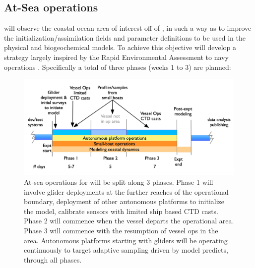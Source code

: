   
\subsection{At-Sea operations}

\proj will observe the coastal ocean area of interest off of \naze, in
such a way as to improve the initialization/assimilation fields and
parameter definitions to be used in the physical and biogeochemical
models. To achieve this objective \proj will develop a strategy largely
inspired by the Rapid Environmental Assessment to navy operations
. Specifically a total of three phases (weeks 1 to 3) are
planned:


\begin{figure}[!t]
  \vspace{-0.5cm}
  \centering
  \includegraphics[scale=0.25]{fig/timelines.jpg}
  \caption{At-sea operations for \proj will be split along 3 phases.
    Phase 1 will involve glider deployments at the further reaches of
    the operational boundary, deployment of other autonomous platforms
    to initialize the model, calibrate sensors with limited ship based
    CTD casts. Phase 2 will commence when the vessel departs the \naz
    operational area. Phase 3 will commence with the resumption of
    vessel ops in the \naz area. Autonomous platforms starting with
    gliders will be operating continuously to target adaptive sampling
    driven by model predicts, through all phases.}
  \vspace{-0.3cm}
 \label{fig:expt-phases}
\end{figure}

 
